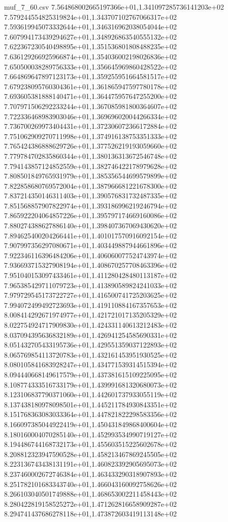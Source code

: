 \begin{filecontents*}{muf_7_60.csv}
7.564868002665197366e+01,1.341097285736141203e+02
7.579244554825319824e+01,1.343707102767066317e+02
7.593619945073332644e+01,1.346316962038054044e+02
7.607994173439294627e+01,1.348926863540555132e+02
7.622367230540498895e+01,1.351536801808488235e+02
7.636129266925966874e+01,1.354036002198026836e+02
7.650500038289756333e+01,1.356645969860428522e+02
7.664869647897123173e+01,1.359255951664581517e+02
7.679238095760304361e+01,1.361865947597780178e+02
7.693605381888140471e+01,1.364475957647255200e+02
7.707971506292233244e+01,1.367085981800364607e+02
7.722336468983903046e+01,1.369696020044266334e+02
7.736700269973404431e+01,1.372306072366172884e+02
7.751062909270711998e+01,1.374916138753351333e+02
7.765424386888629726e+01,1.377526219193059660e+02
7.779784702835860344e+01,1.380136313672546748e+02
7.794143857124852559e+01,1.382746422178979628e+02
7.808501849765931979e+01,1.385356544699579899e+02
7.822858680769572004e+01,1.387966681221678300e+02
7.837214350146311403e+01,1.390576831732487335e+02
7.851568857907822974e+01,1.393186996219246794e+02
7.865922204064857226e+01,1.395797174669160086e+02
7.880274388627886140e+01,1.398407367069430620e+02
7.894625400204266441e+01,1.401017570916092154e+02
7.907997356297080671e+01,1.403449887944661896e+02
7.922346116396484206e+01,1.406060077524743974e+02
7.936693715327908194e+01,1.408670257708463396e+02
7.951040153097433461e+01,1.411280428480113187e+02
7.965385429711079723e+01,1.413890589824241033e+02
7.979729545173722727e+01,1.416500741725203625e+02
7.994072499492723693e+01,1.419110884167357653e+02
8.008414292671974977e+01,1.421721017135205329e+02
8.022754924717909830e+01,1.424331140613212483e+02
8.037094395636832189e+01,1.426941254585690331e+02
8.051432705433195736e+01,1.429551359037122893e+02
8.065769854113720783e+01,1.432161453951930525e+02
8.080105841683928247e+01,1.434771539314515394e+02
8.094440668149617579e+01,1.437381615109225095e+02
8.108774333516733179e+01,1.439991681320680073e+02
8.123106837790371060e+01,1.442601737933055119e+02
8.137438180978098501e+01,1.445211784930843351e+02
8.151768363083033364e+01,1.447821822298583356e+02
8.166097385044922419e+01,1.450431849868400604e+02
8.180160004070285140e+01,1.452993534990719127e+02
8.194486744168732173e+01,1.455603515225602678e+02
8.208812323947590528e+01,1.458213467869245505e+02
8.223136743438131191e+01,1.460823392905695073e+02
8.237460002672746384e+01,1.463433290318907893e+02
8.251782101683343740e+01,1.466043160092758626e+02
8.266103040501749888e+01,1.468653002211458443e+02
8.280422819158525272e+01,1.471262816658909287e+02
8.294741437686278118e+01,1.473872603419113148e+02

\end{filecontents*}
